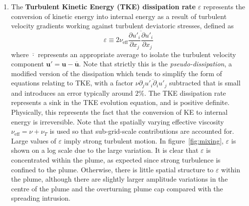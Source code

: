 \documentclass[a4paper]{article}
\begin{document}
\begin{enumerate}[label=(\alph*)]
	\item The \textbf{Turbulent Kinetic Energy (TKE) dissipation rate} $\varepsilon$ represents the conversion
		of kinetic energy into internal energy as a result of turbulent velocity gradients working against
		turbulent deviatoric stresses, defined as
		\begin{equation}
			\varepsilon \equiv 2\nu_{\text{eff}} \overline{\frac{\partial u'_i}{\partial x_j} \frac{\partial
					u'_i}{\partial x_j}}
		\end{equation}
		where $\overline{\cdot}$ represents an appropriate average to isolate the turbulent velocity component
		$\bm{u}' = \bm{u}-\overline{\bm{u}}$. Note that strictly this is the \emph{pseudo-dissipation}, a
		modified version of the dissipation which tends to simplify the form of equations relating to TKE,
		with a factor $\nu \overline{\partial_j u'_i \partial_i u'_j}$ subtracted that is small and introduces
		an error typically around $2\%$. The TKE dissipation rate represents a sink in the TKE evolution
		equation, and is positive definite.  Physically, this represents the fact that the conversion of KE to
		internal energy is irreversible.  Note that the spatially varying effective viscosity
		$\nu_{\text{eff}} = \nu + \nu_T$ is used so that sub-grid-scale contributions are accounted for. Large
		values of $\varepsilon$ imply strong turbulent motion. In figure~\ref{fig:mixing}, $\varepsilon$ is
		shown on a log scale due to the large variation.  It is clear that $\varepsilon$ is concentrated
		within the plume, as expected since strong turbulence is confined to the plume.  Otherwise, there is
		little spatial structure to $\varepsilon$ within the plume, although there are slightly larger
		amplitude variations in the centre of the plume and the overturning plume cap compared with the
		spreading intrusion.


\end{enumerate}
\end{document}
